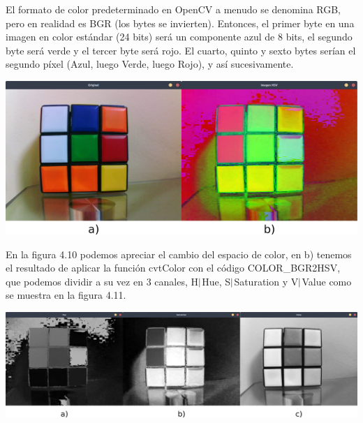 El formato de color predeterminado en OpenCV a menudo se denomina RGB, pero en realidad
es BGR (los bytes se invierten). Entonces, el primer byte en una imagen en color estándar
(24 bits) será un componente azul de 8 bits, el segundo byte será verde y el tercer
byte será rojo. El cuarto, quinto y sexto bytes serían el segundo píxel (Azul, luego
Verde, luego Rojo), y así sucesivamente.
\begin{center}
	\includegraphics[width=0.95 \textwidth]{Contenido/Cuerpo/Capitulo4/Fig2.eps}
	\label{Fig6}
\end{center}
En la figura 4.10 podemos apreciar el cambio del espacio de color, en b) tenemos el resultado de aplicar la función cvtColor
con el código COLOR\_BGR2HSV, que podemos dividir a su vez en 3 canales, H$\arrowvert$Hue, S$\arrowvert$Saturation y
V$\arrowvert$Value como se muestra en la figura 4.11.
\begin{center}
	\includegraphics[width=0.95 \textwidth]{Contenido/Cuerpo/Capitulo4/Fig3.eps}
	\label{Fig6}
\end{center}

